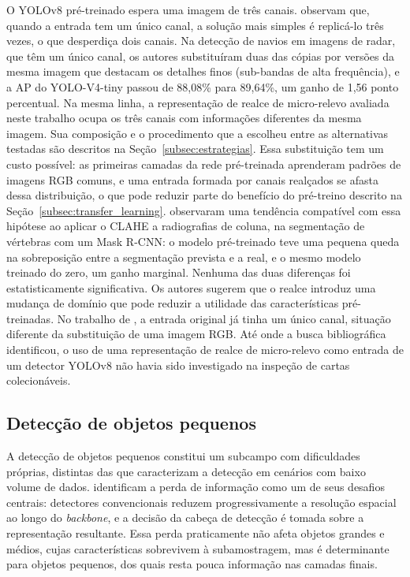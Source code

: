 \documentclass[
    12pt,                %
    openright,           %
    oneside,             %
    a4paper,             %
    english,             %
    brazil               %
]{abntex2}
\begin{document}
O YOLOv8 pré-treinado espera uma imagem de três canais.
 observam que, quando a entrada tem um único
canal, a solução mais simples é replicá-lo três vezes, o que
desperdiça dois canais. Na detecção de navios em imagens de radar, que
têm um único canal, os autores substituíram duas das cópias por
versões da mesma imagem que destacam os detalhes finos (sub-bandas de
alta frequência), e a AP do YOLO-V4-tiny passou de 88,08\% para
89,64\%, um ganho de 1,56 ponto percentual. Na mesma linha, a
representação de realce de micro-relevo avaliada neste trabalho ocupa
os três canais com informações diferentes da mesma imagem. Sua
composição e o procedimento que a escolheu entre as alternativas
testadas são descritos na Seção~\ref{subsec:estrategias}. Essa
substituição tem um custo possível: as primeiras camadas da rede
pré-treinada aprenderam padrões de imagens RGB comuns, e uma entrada
formada por canais realçados se afasta dessa distribuição, o que pode
reduzir parte do benefício do pré-treino descrito na
Seção~\ref{subsec:transfer_learning}.  observaram
uma tendência compatível com essa hipótese ao aplicar o CLAHE a
radiografias de coluna, na segmentação de vértebras com um Mask R-CNN:
o modelo pré-treinado teve uma pequena queda na sobreposição entre a
segmentação prevista e a real, e o mesmo modelo treinado do zero, um
ganho marginal. Nenhuma das duas diferenças foi estatisticamente
significativa. Os autores sugerem que o realce introduz uma mudança de
domínio que pode reduzir a utilidade das características
pré-treinadas. No trabalho de , a entrada
original já tinha um único canal, situação diferente da substituição de
uma imagem RGB. Até onde
a busca bibliográfica identificou, o uso de uma representação de
realce de micro-relevo como entrada de um detector YOLOv8 não havia
sido investigado na inspeção de cartas colecionáveis.

\subsection{Detecção de objetos pequenos}
\label{subsec:objetos_pequenos}

A detecção de objetos pequenos constitui um subcampo com dificuldades
próprias, distintas das que caracterizam a detecção em cenários com baixo volume
de dados.  identificam a perda de informação como um
de seus desafios centrais: detectores convencionais reduzem progressivamente
a resolução espacial ao longo do \textit{backbone}, e a decisão da cabeça de
detecção é tomada sobre a representação resultante. Essa perda praticamente
não afeta objetos grandes e médios, cujas características sobrevivem à
subamostragem, mas é determinante para objetos pequenos, dos quais resta
pouca informação nas camadas finais.
\end{document}
